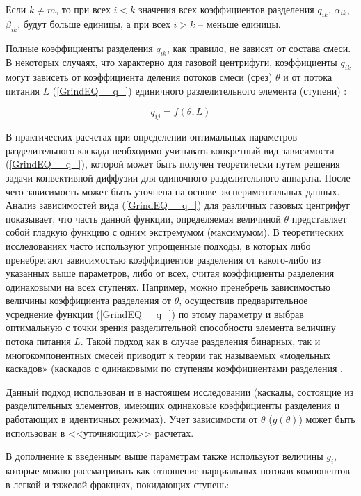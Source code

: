 Если $k\ne m$, то при всех $i<k$ значения всех коэффициентов разделения $q_{ik}$, $\alpha _{ik}$, $\beta _{ik}$, будут больше единицы, а при всех $i>k$ -- меньше единицы.

Полные коэффициенты разделения $q_{ik} $, как правило, не зависят от состава смеси. В некоторых случаях, что характерно для газовой центрифуги, коэффициенты $q_{ik}$ могут зависеть от коэффициента деления потоков смеси (срез) $\theta$ и от потока питания $L$ (\ref{GrindEQ__q_}) единичного разделительного элемента (ступени) \cite{mustafinObjectiveFunctionOptimization2019}:

\begin{equation} \label{GrindEQ__q_} 
  q_{ij} = f(\theta, L)          
\end{equation}

В практических расчетах при определении оптимальных параметров разделительного каскада необходимо учитывать конкретный вид зависимости (\ref{GrindEQ__q_}), которой может быть получен теоретически путем решения задачи конвективной диффузии для одиночного разделительного аппарата. После чего зависимость может быть уточнена на основе экспериментальных данных. 
Анализ зависимостей вида (\ref{GrindEQ__q_}) для различных газовых центрифуг показывает, что часть данной функции, определяемая величиной $\theta $ представляет собой гладкую функцию с одним экстремумом (максимумом). В теоретических исследованиях часто используют упрощенные подходы, в которых либо пренебрегают зависимостью коэффициентов разделения от какого-либо из указанных выше параметров, либо от всех, считая коэффициенты разделения одинаковыми на всех ступенях. Например, можно пренебречь зависимостью величины коэффициента разделения от $\theta$, осуществив предварительное усреднение функции (\ref{GrindEQ__q_}) по этому параметру и выбрав оптимальную с точки зрения разделительной способности элемента величину потока питания $L$. Такой подход как в случае разделения бинарных, так и многокомпонентных смесей приводит к теории так называемых «модельных каскадов» (каскадов с одинаковыми по ступеням коэффициентами разделения \cite{sulaberidzeClassificationModelCascades2020}.

Данный подход использован и в настоящем исследовании (каскады, состоящие из разделительных элементов, имеющих одинаковые коэффициенты разделения и работающих в идентичных режимах). Учет зависимости от $\theta$ ($g(\theta)$) может быть использован в <<уточняющих>> расчетах.

В дополнение к введенным выше параметрам также используют величины $g_{i}$, которые можно рассматривать как отношение парциальных потоков компонентов в легкой и тяжелой фракциях, покидающих ступень:

